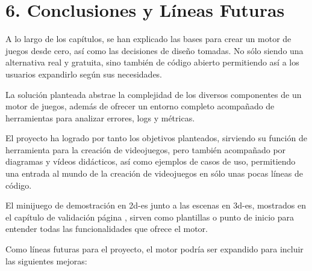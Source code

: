 \chapter*{6. Conclusiones y Líneas Futuras}\label{cap:conclusions}

A lo largo de los capítulos, se han explicado las bases para crear un motor de juegos desde cero, así como las decisiones
de diseño tomadas. No sólo siendo una alternativa real y gratuita, sino también de código abierto permitiendo así a los usuarios
expandirlo según sus necesidades.

La solución planteada abstrae la complejidad de los diversos componentes de un motor de juegos, además de ofrecer un 
entorno completo acompañado de herramientas para analizar errores, logs y métricas.

El proyecto ha logrado por tanto los objetivos planteados, sirviendo su función de herramienta para la creación de videojuegos, pero también
acompañado por diagramas y vídeos didácticos, así como ejemplos de casos de uso, permitiendo una entrada al mundo de
la creación de videojuegos en sólo unas pocas líneas de código.

El minijuego de demostración en \gls{2d-es} junto a las escenas en \gls{3d-es}, mostrados en el capítulo de validación página \pageref{cap:validation}, sirven como 
plantillas o punto de inicio para entender todas las funcionalidades que ofrece el motor.

Como líneas futuras para el proyecto, el motor podría ser expandido para incluir las siguientes mejoras:


